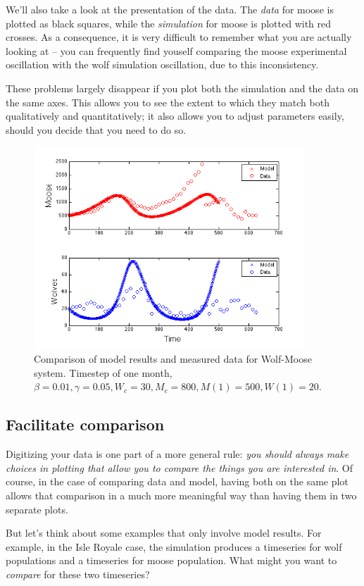 \documentclass{tufte-handout}
\begin{document}
We'll also take a look at the presentation of the data.  The {\it data} for moose is plotted as black squares, while the {\it simulation} for moose is plotted with red crosses.  As a consequence, it is very difficult to remember what you are actually looking at -- you can frequently find youself comparing the moose experimental oscillation with the wolf simulation oscillation, due to this inconsistency.

These problems largely disappear if you plot both the simulation and the data on the same axes.  This allows you to see the extent to which they match both qualitatively and quantitatively; it also allows you to adjust parameters easily, should you decide that you need to do so. 

\begin{figure}[h!]
\includegraphics[width=4in]{figs/ModelDataComparison}
\caption{Comparison of model results and measured data  for Wolf-Moose system. Timestep of one month,  $\beta = 0.01, \gamma = 0.05, W_c = 30, M_c=800, M(1) = 500, W(1) = 20$.}
\end{figure}


\subsection{Facilitate comparison}

Digitizing your data is one part of a more general rule:  {\it you should always make choices in plotting that allow you to compare the things you are interested in}.  Of course, in the case of comparing data and model, having both on the same plot allows that comparison in a much more meaningful way than having them in two separate plots.  

But let's think about some examples that only involve model results.  For example, in the Isle Royale case, the simulation produces a timeseries for wolf populations and a timeseries for moose population.  What might you want to {\em compare} for these two timeseries?  
\end{document}
